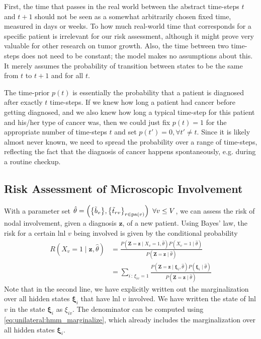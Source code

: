 \documentclass[\relativeRoot/main.tex]{subfiles}
\begin{document}
First, the time that passes in the real world between the abstract time-steps $t$ and $t+1$ should not be seen as a somewhat arbitrarily chosen fixed time, measured in days or weeks. To how much real-world time that corresponds for a specific patient is irrelevant for our risk assessment, although it might prove very valuable for other research on tumor growth. Also, the time between two time-steps does not need to be constant; the model makes no assumptions about this. It merely assumes the probability of transition between states to be the same from $t$ to $t+1$ and for all $t$.

The time-prior $p(t)$ is essentially the probability that a patient is diagnosed after exactly $t$ time-steps. If we knew how long a patient had cancer before getting diagnosed, and we also knew how long a typical time-step for this patient and his/her type of cancer was, then we could just fix $p(t)=1$ for the appropriate number of time-steps $t$ and set $p(t') = 0, \forall t' \neq t$. Since it is likely almost never known, we need to spread the probability over a range of time-steps, reflecting the fact that the diagnosis of cancer happens spontaneously, e.g. during a routine checkup.

\subsection{Risk Assessment of Microscopic Involvement}
\label{subsec:unilateral:formalism:risk_assessment}

With a parameter set $\hat{\theta} = \left( \big\{ \Tilde{b}_v \big\}, \big\{ \Tilde{t}_{rv} \big\}_{r \in \operatorname{pa}(v)} \right) \ \forall v \leq V$, we can assess the risk of nodal involvement, given a diagnosis $\mathbf{z}$, of a new patient. Using Bayes' law, the risk for a certain \gls{lnl} $v$ being involved is given by the conditional probability
%
\begin{equation} \label{eq:unilateral:sampling:risk}
    \begin{aligned}
        R \left( X_v=1 \mid \mathbf{z}, \hat{\theta} \right) 
        &= \frac{P \left( \mathbf{Z}=\mathbf{z} \mid X_v=1, \hat{\theta} \right) P \left( X_v=1 \mid \hat{\theta} \right)}{P \left( \mathbf{Z}=\mathbf{z} \mid \hat{\theta} \right)} \\
        &= \sum_{i\,:\,\xi_{iv}=1}{\frac{P \left( \mathbf{Z}=\mathbf{z} \mid \boldsymbol{\xi}_i , \hat{\theta} \right) P \left( \boldsymbol{\xi}_i \mid \hat{\theta} \right)}{P \left( \mathbf{Z}=\mathbf{z} \mid \hat{\theta} \right)}}
    \end{aligned}
\end{equation}
%
Note that in the second line, we have explicitly written out the marginalization over all hidden states $\boldsymbol{\xi}_i$ that have \gls{lnl} $v$ involved. We have written the state of \gls{lnl} $v$ in the state $\boldsymbol{\xi}_i$ as $\xi_{iv}$. The denominator can be computed using \cref{eq:unilateral:hmm_marginalize}, which already includes the marginalization over all hidden states $\boldsymbol{\xi}_i$.
\end{document}
